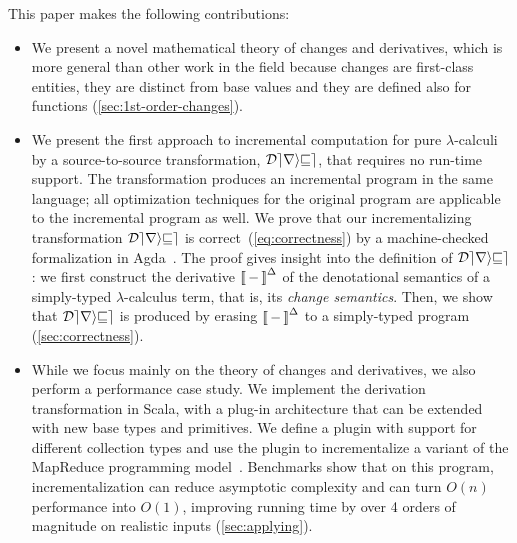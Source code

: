 This paper makes the following contributions:
\begin{itemize}
\item We present a novel mathematical theory of changes and derivatives, which is more
  general than other work in the field because changes are
  first-class entities, they are distinct from base values and
  they are defined also for functions (\cref{sec:1st-order-changes}).
%
\item We present the first approach to incremental computation for
pure $\lambda$-calculi by a source-to-source transformation, $\mathcal{Derive}$, that requires no run-time
support. The transformation produces an incremental program in the same language;
all optimization techniques for the original program are
applicable to the incremental program as well.
%
%
We prove that our incrementalizing transformation $\mathcal{Derive}$
is correct~(\cref{eq:correctness})
by a machine-checked formalization in Agda~\citep{agda-head}.
The proof gives insight into the definition of $\mathcal{Derive}$: we
first construct the derivative $\EvalInc{-}$ of the denotational
semantics of a simply-typed $\lambda$-calculus term, that is, its
\emph{change semantics}.
%
Then, we show that $\mathcal{Derive}$ is produced by erasing
$\EvalInc{-}$ to a simply-typed program (\cref{sec:correctness}).

\item While we focus mainly on the theory of changes
and derivatives, we also perform a performance case study.
We implement the derivation transformation in Scala,
with a plug-in architecture that can be extended with new base
types and primitives. We define a plugin with support for
different collection types and use the plugin to 
incrementalize a variant of the MapReduce programming model~\citep{Lammel07}.
  Benchmarks show that on this program,
  incrementalization can reduce asymptotic complexity and can turn $O(n)$
  performance into $O(1)$, improving running time by over 4
  orders of magnitude on realistic inputs (\cref{sec:applying}).

\end{itemize}

